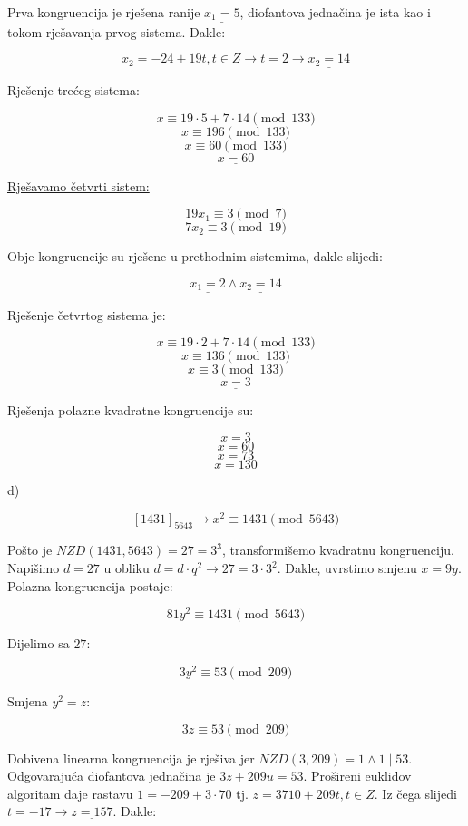 \documentclass[12pt]{article}
\begin{document}
Prva kongruencija je rješena ranije $\underline{x_{1} = 5}$, diofantova jednačina je ista kao i tokom rješavanja prvog sistema. Dakle:

$$x_{2} = -24 + 19t, t \in Z \to t = 2 \to \underline{x_{2} = 14}$$\vspace{1mm}

Rješenje trećeg sistema:

$$x \equiv 19 \cdot 5 + 7 \cdot 14 \pmod{133}$$
$$x \equiv 196 \pmod{133}$$
$$x \equiv 60 \pmod{133}$$
$$\underline{x = 60}$$\vspace{1mm}

\underline{Rješavamo četvrti sistem:}

$$19x_{1} \equiv 3 \pmod{7}$$
$$7x_{2} \equiv 3 \pmod{19}$$\vspace{1mm}

Obje kongruencije su rješene u prethodnim sistemima, dakle slijedi:

$$\underline{x_{1} = 2} \land \underline{x_{2} = 14}$$\vspace{1mm}

Rješenje četvrtog sistema je:

$$x \equiv 19 \cdot 2 + 7 \cdot 14 \pmod{133}$$
$$x \equiv 136 \pmod{133}$$
$$x \equiv 3 \pmod{133}$$
$$\underline{x = 3}$$\vspace{1mm}

Rješenja polazne kvadratne kongruencije su:

$$x = 3$$
$$x = 60$$
$$x = 73$$
$$x = 130$$

d)

$$[1431]_{5643} \to x^2\equiv 1431 \pmod{5643}$$\vspace{1mm}

Pošto je $NZD(1431, 5643) = 27 = 3^3$, transformišemo kvadratnu kongruenciju. Napišimo $d = 27$ u obliku $d = d \cdot q^2 \to 27 = 3 \cdot 3^2$. Dakle, uvrstimo smjenu $x = 9y$. Polazna kongruencija postaje:

$$81y^2 \equiv 1431 \pmod{5643}$$\vspace{1mm}

Dijelimo sa $27$:

$$3y^2 \equiv 53 \pmod{209}$$\vspace{1mm}

Smjena $y^2 = z$:

$$3z \equiv 53 \pmod{209}$$\vspace{1mm}

Dobivena linearna kongruencija je rješiva jer $NZD(3, 209) = 1 \land 1 \mid 53$. Odgovarajuća diofantova jednačina je $3z + 209u = 53$. Prošireni euklidov algoritam daje rastavu $1 = -209 + 3 \cdot 70$ tj. $z = 3710 + 209t, t \in Z$. Iz čega slijedi $t = -17 \to \underline{z = 157}$. Dakle:
\end{document}
